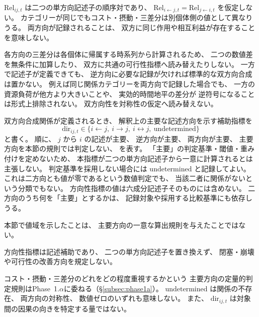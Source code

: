\begin{remark}[双方向合成関係の非対称性]
\label{rem:bidirect_asymmetry}
$\mathrm{Rel}_{ij,t}$ は二つの単方向記述子の順序対であり、
$\mathrm{Rel}_{i\leftarrow j,t}=\mathrm{Rel}_{j\leftarrow i,t}$ を仮定しない。
カテゴリーが同じでもコスト・摂動・三差分は別個体側の値として異なりうる。
両方向が記録されることは、
双方に同じ作用や相互利益が存在することを意味しない。

各方向の三差分は各個体に帰属する時系列から計算されるため、
二つの数値差を無条件に加算したり、
双方に共通の可行性指標へ読み替えたりしない。
一方で記述子が定義できても、
逆方向に必要な記録が欠ければ標準的な双方向合成は置かない。
例えば同じ関係カテゴリーを両方向で記録した場合でも、
一方の資源負荷が他方より大きいことや、
実効的時間地平の差分が
逆符号になることは形式上排除されない。
双方向性を対称性の仮定へ読み替えない。
\end{remark}

\begin{definition}
\label{def:relation_direction}
双方向合成関係が定義されるとき、
解釈上の主要な記述方向を示す補助指標を
\[
 \mathrm{dir}_{ij,t}\in
 \{i\leftarrow j,\ i\rightarrow j,\ i\leftrightarrow j,\ \mathrm{undetermined}\}
\]
と書く。
順に、
$j$ から $i$ の記述が主要、
逆方向が主要、
両方向が主要、
主要方向を本節の規則では判定しない、
を表す。
「主要」の判定基準・閾値・重み付けを定めないため、
本指標が二つの単方向記述子から一意に計算されるとは主張しない。
判定基準を採用しない場合には $\mathrm{undetermined}$ と記録してよい。
これは二方向とも値が零であるという数値判定でも、
当該二者に関係がないという分類でもない。
方向性指標の値は六成分記述子そのものには含めない。
二方向のうち何を「主要」とするかは、
記録対象や採用する比較基準にも依存しうる。

本節で値域を示したことは、
主要方向の一意な算出規則を与えたことではない。
\end{definition}

\begin{remark}[方向性指標の補助的地位]
\label{rem:dir_auxiliary}
方向性指標は記述補助であり、
二つの単方向記述子を置き換えず、
閉塞・崩壊や可行性の改善方向を規定しない。
\end{remark}

\begin{remark}[方向性判定の未定義部分]
\label{rem:dir_undefined}
コスト・摂動・三差分のどれをどの程度重視するかという
主要方向の定量的判定規則はPhase~1.$\alpha$に委ねる（\S\ref{subsec:phase1a}）。
$\mathrm{undetermined}$ は関係の不存在、
両方向の対称性、
数値ゼロのいずれも意味しない。
また、
$\mathrm{dir}_{ij,t}$ は対象間の因果の向きを特定する量ではない。
\end{remark}

